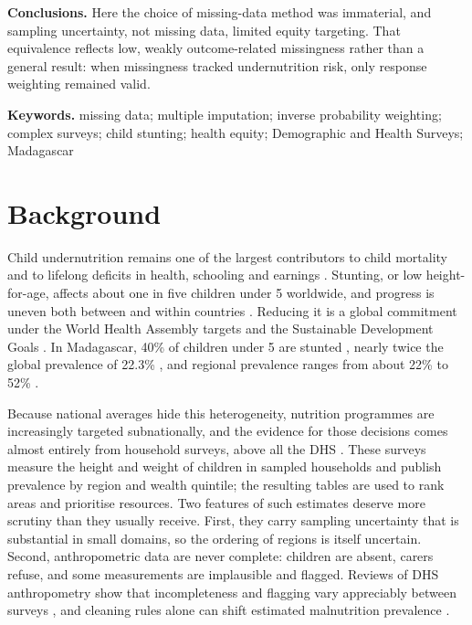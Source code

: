 \documentclass[11pt,a4paper]{article}
\begin{document}
\textbf{Conclusions.} Here the choice of missing-data method was
immaterial, and sampling uncertainty, not missing data, limited equity
targeting. That equivalence reflects low, weakly outcome-related
missingness rather than a general result: when missingness tracked
undernutrition risk, only response weighting remained valid.

\textbf{Keywords.} missing data; multiple imputation; inverse
probability weighting; complex surveys; child stunting; health equity;
Demographic and Health Surveys; Madagascar

\section{Background}\label{background}

Child undernutrition remains one of the largest contributors to child
mortality and to lifelong deficits in health, schooling and earnings
\cite{black2013maternal,deonis2016childhood}. Stunting, or low
height-for-age, affects about one in five children under 5 worldwide,
and progress is uneven both between and within countries
\cite{unicef2023levels,victora2021revisiting}. Reducing it is a global
commitment under the World Health Assembly targets and the Sustainable
Development Goals \cite{who2014global}. In Madagascar, 40\% of children
under 5 are stunted \cite{instat2022edsmd}, nearly twice the global
prevalence of 22.3\% \cite{unicef2023levels}, and regional prevalence
ranges from about 22\% to 52\% \cite{instat2022edsmd}.

Because national averages hide this heterogeneity, nutrition programmes
are increasingly targeted subnationally, and the evidence for those
decisions comes almost entirely from household surveys, above all the
DHS \cite{corsi2012demographic}. These surveys measure the height and
weight of children in sampled households and publish prevalence by
region and wealth quintile; the resulting tables are used to rank areas
and prioritise resources. Two features of such estimates deserve more
scrutiny than they usually receive. First, they carry sampling
uncertainty that is substantial in small domains, so the ordering of
regions is itself uncertain. Second, anthropometric data are never
complete: children are absent, carers refuse, and some measurements are
implausible and flagged. Reviews of DHS anthropometry show that
incompleteness and flagging vary appreciably between surveys
\cite{assaf2015assessment,perumal2020anthropometric}, and cleaning rules
alone can shift estimated malnutrition prevalence
\cite{crowe2014effect}.
\end{document}

